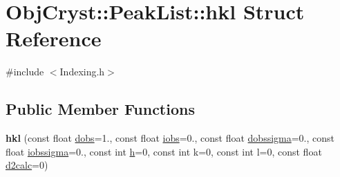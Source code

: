 \hypertarget{struct_obj_cryst_1_1_peak_list_1_1hkl}{}\section{Obj\+Cryst\+::Peak\+List\+::hkl Struct Reference}
\label{struct_obj_cryst_1_1_peak_list_1_1hkl}


{\ttfamily \#include $<$Indexing.\+h$>$}

\subsection*{Public Member Functions}
\begin{DoxyCompactItemize}
\item 
\mbox{\label{struct_obj_cryst_1_1_peak_list_1_1hkl_a8c23626fff887e4eae3941b76dfa39e6}} 
{\bfseries hkl} (const float \mbox{\hyperlink{struct_obj_cryst_1_1_peak_list_1_1hkl_a55f08e63e4fb2b1144a443ff9af6f417}{dobs}}=1., const float \mbox{\hyperlink{struct_obj_cryst_1_1_peak_list_1_1hkl_a84f98b9cf3b479c563d49dbb87e42700}{iobs}}=0., const float \mbox{\hyperlink{struct_obj_cryst_1_1_peak_list_1_1hkl_a8faeba0e940c91c2fcc26076eb4a3a9d}{dobssigma}}=0., const float \mbox{\hyperlink{struct_obj_cryst_1_1_peak_list_1_1hkl_aec948131b33d0f5a1c898119d131e0d8}{iobssigma}}=0., const int \mbox{\hyperlink{struct_obj_cryst_1_1_peak_list_1_1hkl_ac0ab3e1d9bacbeb86c581adc48b61d51}{h}}=0, const int k=0, const int l=0, const float \mbox{\hyperlink{struct_obj_cryst_1_1_peak_list_1_1hkl_a16036f6dea4f34c7715bafa41e08d913}{d2calc}}=0)
\end{DoxyCompactItemize}
